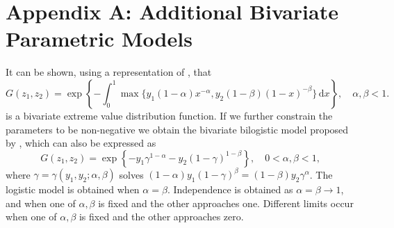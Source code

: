 \documentclass[11pt,a4paper]{article}
\begin{document}



\section*{Appendix A: Additional Bivariate Parametric Models}

It can be shown, using a representation of \citet{haan84}, that
\begin{equation*}
G(z_1,z_2) = \exp\left\{ - \int_0^1\max\{y_1(1-\alpha)x^{-\alpha},y_2(1-\beta)(1-x)^{-\beta}\} \, \text{d}x \right\}, \quad \alpha,\beta < 1.
\end{equation*}
is a bivariate extreme value distribution function. If we further constrain the parameters to be non-negative we obtain the bivariate bilogistic model proposed by \citet{smit90}, which can also be expressed as
\begin{equation*}
G(z_1,z_2) = \exp\left\{ - y_1\gamma^{1-\alpha} - y_2(1-\gamma)^{1-\beta} \right\}, \quad 0 < \alpha,\beta <1,
\end{equation*}
where $\gamma=\gamma(y_1,y_2;\alpha,\beta)$ solves $(1-\alpha)y_1(1-\gamma)^\beta=(1-\beta)y_2\gamma^\alpha$.
The logistic model is obtained when $\alpha=\beta$.
Independence is obtained as $\alpha = \beta \rightarrow1$, and when one of $\alpha,\beta$ is fixed and the other approaches one.
Different limits occur when one of $\alpha,\beta$ is fixed and the other approaches zero.
\end{document}
